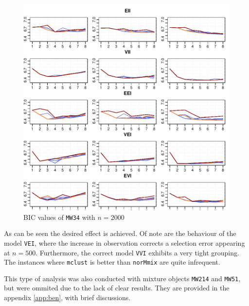 \begin{figure}[h!]
    \begin{Rgraph}[0.9]
\includegraphics{chapter3-figmw34bicfirst}
    \caption{BIC values of {\tt MW34} with $n=2000$}
    \label{fig:bicmw34first}
    \end{Rgraph}
\end{figure}

As can be seen the desired effect is achieved. Of note are the behaviour of 
the model {\tt VEI}, where the increase in observation corrects a selection
error appearing at $n=500$. Furthermore, the correct model {\tt VVI} exhibits
a very tight grouping. The instances where {\tt mclust} is better than 
{\tt norMmix} are quite infrequent.

This type of analysis was also conducted with mixture objects {\tt MW214} and 
{\tt MW51}, but were ommited due to the lack of clear results. They are 
provided in the appendix \ref{app:ben}, with brief discussions.

